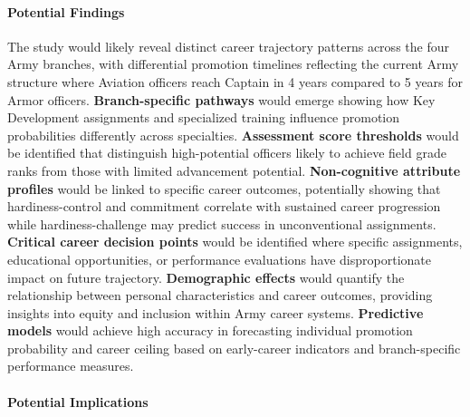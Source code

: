 \documentclass[main.tex]{subfiles}
\begin{document}
\paragraph{Potential Findings}

The study would likely reveal distinct career trajectory patterns across the four Army branches, with differential promotion timelines reflecting the current Army structure where Aviation officers reach Captain in 4 years compared to 5 years for Armor officers\parencite{army_indicators}. \textbf{Branch-specific pathways} would emerge showing how Key Development assignments and specialized training influence promotion probabilities differently across specialties. \textbf{Assessment score thresholds} would be identified that distinguish high-potential officers likely to achieve field grade ranks from those with limited advancement potential. \textbf{Non-cognitive attribute profiles} would be linked to specific career outcomes, potentially showing that hardiness-control and commitment correlate with sustained career progression while hardiness-challenge may predict success in unconventional assignments\parencite{army_indicators}. \textbf{Critical career decision points} would be identified where specific assignments, educational opportunities, or performance evaluations have disproportionate impact on future trajectory. \textbf{Demographic effects} would quantify the relationship between personal characteristics and career outcomes, providing insights into equity and inclusion within Army career systems. \textbf{Predictive models} would achieve high accuracy in forecasting individual promotion probability and career ceiling based on early-career indicators and branch-specific performance measures.

\paragraph{Potential Implications}
\end{document}
